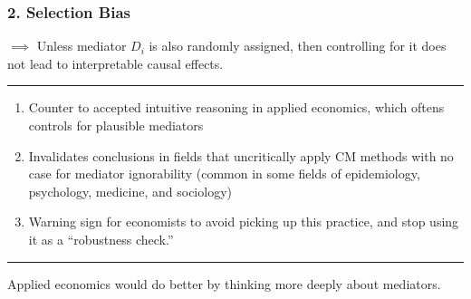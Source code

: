 \documentclass[dvipsnames]{beamer} %
\begin{document}
\begin{frame}
    \frametitle{2. Selection Bias}
    $\implies$ Unless mediator $D_i$ is also randomly assigned, then controlling for it does not lead to interpretable causal effects.
    \vskip0.25cm

    \par\noindent\rule{\textwidth}{0.4pt}
    \begin{enumerate}
        \item Counter to accepted intuitive reasoning in applied economics, which oftens controls for plausible mediators
        \item Invalidates conclusions in fields that uncritically apply CM methods with no case for mediator ignorability (common in some fields of epidemiology, psychology, medicine, and sociology)
        \item Warning sign for economists to avoid picking up this practice, and stop using it as a ``robustness check.''
    \end{enumerate}
    \vfill
    \par\noindent\rule{\textwidth}{0.4pt}
    Applied economics would do better by thinking more deeply about mediators.
\end{frame}
\end{document}
